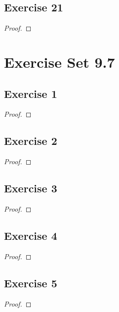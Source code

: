 \documentclass[14pt]{extarticle}
\begin{document}
\subsection{Exercise 21}

\begin{proof}

\end{proof}

\section{Exercise Set 9.7}

\subsection{Exercise 1}

\begin{proof}

\end{proof}

\subsection{Exercise 2}

\begin{proof}

\end{proof}

\subsection{Exercise 3}

\begin{proof}

\end{proof}

\subsection{Exercise 4}

\begin{proof}

\end{proof}

\subsection{Exercise 5}

\begin{proof}

\end{proof}
\end{document}
